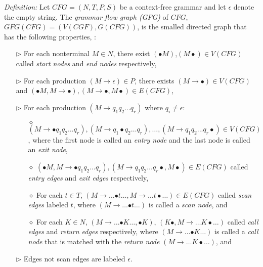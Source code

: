 \documentclass{sigplanconf}
\begin{document}
\textit{Definition:} Let $CFG = (N, T, P, S)$ be a context-free grammar and let $\epsilon$ denote the empty string. The \textit{grammar flow graph (GFG)} of $CFG$, $GFG(CFG) = (V(CGF), G(CFG))$, is the smalled directed graph that has the following properties, \cite{bilardi-pingali}:
\begin{itemize}
\item[$\triangleright$] For each nonterminal $M\in{N}$, there exist $(\bullet{M})$,$(M\bullet){\in{V(CFG)}}$ called \textit{start nodes} and \textit{end nodes} respectively,
\item[$\triangleright$] For each production $(M\longrightarrow{\epsilon})\in{P}$, there exists $(M\longrightarrow{\bullet})\in{V(CFG)}$ and $(\bullet{M}, M\longrightarrow{\bullet}),(M\longrightarrow{\bullet}, M\bullet)\in{E(CFG)}$,
\item[$\triangleright$] For each production $(M\longrightarrow{q_1q_2\dots{q_r}})$ where $q_i \neq \epsilon$:
\begin{itemize}
\item[$\diamond$] $(M\longrightarrow{\bullet{q_1q_2\dots{q_r}}}), (M\longrightarrow{q_1\bullet{q_2\dots{q_r}}}), \dots, (M\longrightarrow{q_1q_2...q_r\bullet})\in{V(CFG)}$, where the first node is called an \textit{entry node} and the last node is called an \textit{exit node},
\item[$\diamond$] $(\bullet{M}, M\longrightarrow{\bullet{q_1q_2\dots{q_r}}}), (M\longrightarrow{q_1q_2\dots{q_r\bullet}}, M\bullet)\in{E(CFG)}$ called \textit{entry edges} and \textit{exit edges} respectively,
\item[$\diamond$] For each $t\in{T}$, $(M\longrightarrow{\dots{\bullet{t\dots}}}, M\longrightarrow{\dots{t\bullet{\dots}}})\in{E(CFG)}$ called \textit{scan edges} labeled $t$, where $(M\longrightarrow{\dots{\bullet{t\dots}}})$ is called a \textit{scan node}, and
\item[$\diamond$] For each $K\in{N}$, $(M\longrightarrow{\dots{\bullet{K\dots}}}, \bullet{K})$, $(K\bullet, M\longrightarrow{\dots{K\bullet{\dots}}})$ called \textit{call edges} and \textit{return edges} respectively, where $(M\longrightarrow{\dots{\bullet{K\dots}}})$ is called a \textit{call node} that is matched with the \textit{return node} $(M\longrightarrow{\dots{K\bullet{\dots}}})$, and
\end{itemize}
\item[$\triangleright$] Edges not scan edges are labeled $\epsilon$.
\end{itemize}
\end{document}
